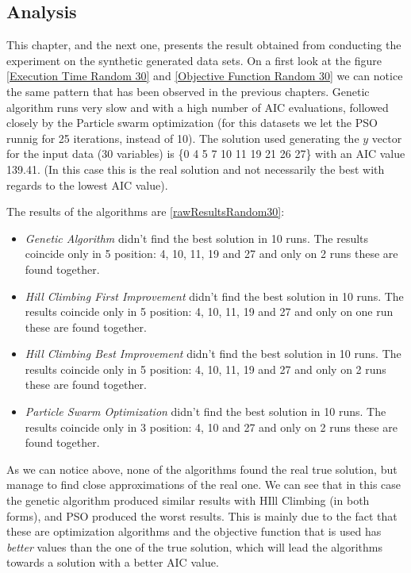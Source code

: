 \subsection{Analysis}
This chapter, and the next one, presents the result obtained from conducting the experiment on the synthetic generated data sets.
On a first look at the figure \ref{Execution Time Random 30} and \ref{Objective Function Random 30} we can notice the same pattern that has been observed in the previous chapters. Genetic algorithm runs very slow and with a high number of AIC evaluations, followed closely by the Particle swarm optimization (for this datasets we let the PSO runnig for 25 iterations, instead of 10). The solution used generating the $y$ vector for the input data (30 variables) is \{0 4 5 7 10 11 19 21 26 27\} with an AIC value 139.41. (In this case this is the real solution and not necessarily the best with regards to the lowest AIC value).

The results of the algorithms are \ref{rawResultsRandom30}:
\begin{itemize}
	\item \textit{Genetic Algorithm} didn't find the best solution in 10 runs. The results coincide only in 5 position: 4, 10, 11, 19 and 27 and only on 2 runs these are found together.
	\item \textit{Hill Climbing First Improvement} didn't find the best solution in 10 runs. The results coincide only in 5 position: 4, 10, 11, 19 and 27 and only on one run these are found together.
	\item \textit{Hill Climbing Best Improvement} didn't find the best solution in 10 runs. The results coincide only in 5 position: 4, 10, 11, 19 and 27 and only on 2 runs these are found together.
	\item \textit{Particle Swarm Optimization} didn't find the best solution in 10 runs. The results coincide only in 3 position: 4, 10 and 27 and only on 2 runs these are found together.
\end{itemize}

As we can notice above, none of the algorithms found the real true solution, but manage to find close approximations of the real one. We can see that in this case the genetic algorithm produced similar results with HIll Climbing (in both forms), and PSO produced the worst results. This is mainly due to the fact that these are optimization algorithms and the objective function that is used has \textit{better} values than the one of the true solution, which will lead the algorithms towards a solution with a better AIC value.


